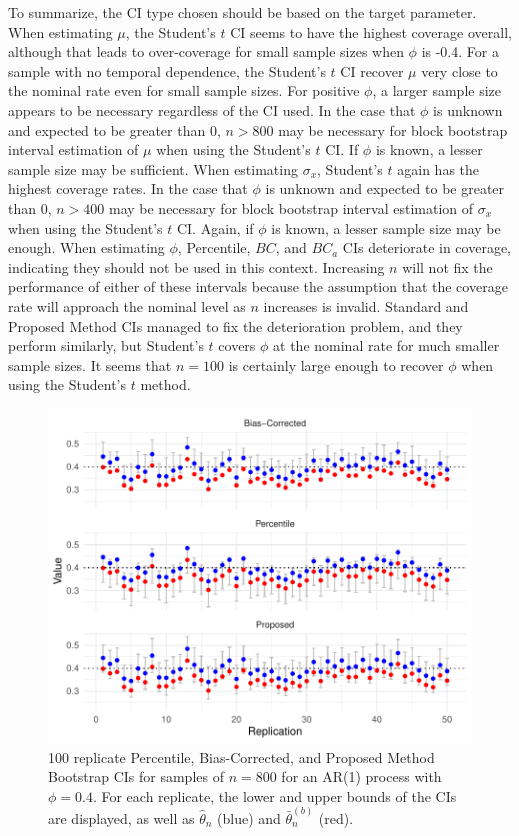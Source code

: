 \documentclass[12pt, letterpaper, titlepage]{article}
\begin{document}
To summarize, the CI type chosen should be based on the target parameter. 
When estimating $\mu$, the Student's $t$ CI seems to have the highest
 coverage
overall, although that leads to over-coverage for small sample sizes when $\phi$
 is -0.4. For a
sample with no temporal dependence, the Student's $t$ CI recover $\mu$ 
very close to the nominal rate even for small sample sizes. For positive $\phi$, a
larger sample size appears to be necessary regardless of the CI used. In the
case that $\phi$ is unknown and expected to be greater than $0$, $n > 800$
may be
necessary for block bootstrap interval estimation of $\mu$ when using the Student's $t$ CI. If $\phi$ is known,
a lesser sample size may be sufficient. When estimating $\sigma_x$,
Student's $t$ again has the highest coverage
rates. In the case that $\phi$ is unknown and expected to be greater than $0$,
$n > 400$ may be necessary for block bootstrap interval estimation of
$\sigma_x$ when using the Student's $t$ CI. Again, if $\phi$ is known, a lesser sample size may be enough.
When estimating $\phi$, Percentile, $BC$, and $BC_a$ CIs 
deteriorate in coverage, indicating they should not be used in this context. 
Increasing $n$ will not fix the performance of either of these intervals 
because the assumption that the coverage rate will approach the nominal level
as $n$ increases is invalid. Standard and Proposed Method CIs managed to fix the
deterioration problem, and they perform similarly, but Student's $t$ covers
$\phi$ at the nominal rate for much smaller sample sizes. It seems that 
$n = 100$ is certainly large enough to
recover $\phi$ when using the Student's $t$ method.



\begin{figure}[tbp]
  \centering
  \includegraphics[width=\textwidth]{figures/norm_phi_intervals}
  \caption{100 replicate Percentile, Bias-Corrected, and Proposed Method Bootstrap CIs for samples of $n = 800$ for
    an AR(1) process with $\phi = 0.4$. For each replicate, the lower and upper bounds
    of the CIs are displayed, as well as $\hat\theta_n$ (blue) and $\bar\theta_n^{(b)}$ (red). }
  \label{fig:npi}
\end{figure}
\end{document}
